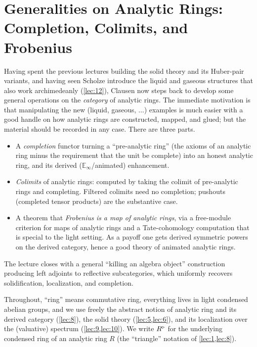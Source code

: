 \section{Generalities on Analytic Rings: Completion, Colimits, and Frobenius}
\label{lec:13}

Having spent the previous lectures building the solid theory and its Huber-pair
variants, and having seen Scholze introduce the liquid and gaseous structures
that also work archimedeanly (\cref{lec:12}), Clausen now steps back to develop
some general operations on the \emph{category} of analytic rings. The immediate
motivation is that manipulating the new (liquid, gaseous, $\dots$) examples is
much easier with a good handle on how analytic rings are constructed, mapped,
and glued; but the material should be recorded in any case. There are three
parts.

\begin{itemize}
\item A \emph{completion} functor turning a ``pre-analytic ring'' (the axioms of
an analytic ring minus the requirement that the unit be complete) into an
honest analytic ring, and its derived ($\mathbb{E}_\infty$/animated)
enhancement.
\item \emph{Colimits} of analytic rings: computed by taking the colimit of
pre-analytic rings and completing. Filtered colimits need no completion;
pushouts (completed tensor products) are the substantive case.
\item A theorem that \emph{Frobenius is a map of analytic rings}, via a
free-module criterion for maps of analytic rings and a Tate-cohomology
computation that is special to the light setting. As a payoff one gets derived
symmetric powers on the derived category, hence a good theory of animated
analytic rings.
\end{itemize}

The lecture closes with a general ``killing an algebra object'' construction
producing left adjoints to reflective subcategories, which uniformly recovers
solidification, localization, and completion.

Throughout, ``ring'' means commutative ring, everything lives in light condensed
abelian groups, and we use freely the abstract notion of analytic ring and its
derived category (\cref{lec:8}), the solid theory (\cref{lec:5,lec:6}), and its
localization over the (valuative) spectrum (\cref{lec:9,lec:10}). We write $R^{\triangleright}$
for the underlying condensed ring of an analytic ring $R$ (the ``triangle''
notation of \cref{lec:1,lec:8}).

